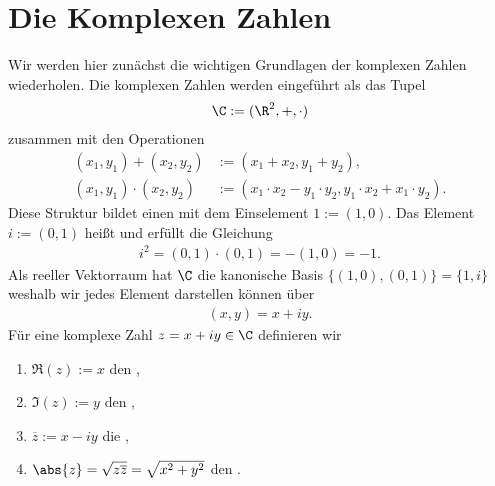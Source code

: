 \documentclass[letterpaper,10pt,german]{jupyterBook}
\begin{document}
\section{Die Komplexen Zahlen}
\label{\detokenize{complexanalysis/complexnumbers:die-komplexen-zahlen}}\label{\detokenize{complexanalysis/complexnumbers::doc}}
\sphinxAtStartPar
Wir werden hier zunächst die wichtigen Grundlagen der komplexen Zahlen wiederholen.
Die komplexen Zahlen werden eingeführt als das Tupel
\begin{equation*}
\begin{split}\C := (\R^2,+,\cdot)\end{split}
\end{equation*}
\sphinxAtStartPar
zusammen mit den Operationen
\begin{equation*}
\begin{split}(x_1,y_1) + (x_2,y_2) &:= (x_1 + x_2, y_1+y_2),\\
(x_1,y_1) \cdot (x_2,y_2) &:= (x_1\cdot x_2 - y_1\cdot y_2, y_1\cdot x_2 + x_1\cdot y_2).\end{split}
\end{equation*}
\sphinxAtStartPar
Diese Struktur bildet einen  mit dem Einselement \(1:=(1,0)\). Das Element \(i:=(0,1)\) heißt  und erfüllt die Gleichung
\begin{equation*}
\begin{split}i^2 = (0,1)\cdot(0,1) = -(1,0) = -1.\end{split}
\end{equation*}
\sphinxAtStartPar
Als reeller Vektorraum hat \(\C\) die kanonische Basis \(\{(1,0),(0,1)\}=\{1,i\}\) weshalb wir jedes Element darstellen können über
\begin{equation*}
\begin{split}(x,y) = x + iy.\end{split}
\end{equation*}
\sphinxAtStartPar
Für eine komplexe Zahl \(z=x+ iy\in\C\) definieren wir
\begin{enumerate}
%
\item {} 
\sphinxAtStartPar
\(\Re(z):= x\) den ,

\item {} 
\sphinxAtStartPar
\(\Im(z):=y\) den ,

\item {} 
\sphinxAtStartPar
\(\overline{z}:= x-iy\) die ,

\item {} 
\sphinxAtStartPar
\(\abs{z} = \sqrt{z\overline{z}} = \sqrt{x^2+y^2}\) den .

\end{enumerate}
\end{document}
